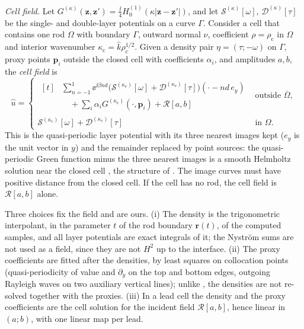 \emph{Cell field.} Let $G^{(\kappa)}(\mathbf z,\mathbf z')=\frac{\ii}{4}
H^{(1)}_0(\kappa|\mathbf z-\mathbf z'|)$, and let $\mathcal S^{(\kappa)}[\omega]$,
$\mathcal D^{(\kappa)}[\tau]$ be the single- and double-layer potentials on a
curve $\Gamma$. Consider a cell that contains one rod $\Omega$ with boundary
$\Gamma$, outward normal $\nu$, coefficient $\rho=\rho_{\mathrm c}$ in $\Omega$ and interior
wavenumber $\kappa_{\mathrm c}=\widehat k\rho_{\mathrm c}^{1/2}$. Given a density pair $\eta=(\tau;-\omega)$ on
$\Gamma$, proxy points $\mathbf p_i$ outside the closed cell with coefficients
$\alpha_i$, and amplitudes $a,b$, the \emph{cell field} is
\begin{equation}\label{eq:mfs-field}
  \widehat u=
  \begin{cases}
    \begin{aligned}[t]
      &\textstyle\sum_{n=-1}^{1}\ee^{\ii\beta nd}\bigl(\mathcal S^{(\kappa_{\mathrm e})}[\omega]
      +\mathcal D^{(\kappa_{\mathrm e})}[\tau]\bigr)(\cdot-nd\,e_y)\\
      &\quad\textstyle+\sum_i\alpha_iG^{(\kappa_{\mathrm e})}(\cdot,\mathbf p_i)+\mathcal R[a,b]
    \end{aligned}
    & \text{outside }\overline\Omega,\\[1ex]
    \mathcal S^{(\kappa_{\mathrm c})}[\omega]+\mathcal D^{(\kappa_{\mathrm c})}[\tau]
    & \text{in }\Omega .
  \end{cases}
\end{equation}
This is the quasi-periodic layer potential with its three nearest images kept
($e_y$ is the unit vector in $y$) and the remainder replaced by point sources: the quasi-periodic Green function
minus the three nearest images is a smooth Helmholtz solution near the closed
cell \cite{Linton1998}, the structure of
\cite{BarnettGreengard2010,BarnettGreengard2011,ChoBarnett2015}. The image
curves must have positive distance from the closed cell. If the cell has no rod,
the cell field is $\mathcal R[a,b]$ alone.

Three choices fix the field and are ours. (i) The density is the trigonometric
interpolant, in the parameter $t$ of the rod boundary $\boldsymbol r(t)$, of the
computed samples, and all layer potentials are exact integrals of
it; the Nystr\"om sums are not used as a field, since they are not $H^2$ up to
the interface. (ii) The proxy coefficients are fitted after the densities, by
least squares on collocation points (quasi-periodicity of value and $\partial_y$
on the top and bottom edges, outgoing Rayleigh waves on two auxiliary vertical
lines); unlike \cite{BarnettGreengard2010}, the densities are not re-solved
together with the proxies. (iii) In a lead cell the density and the proxy
coefficients are the cell solution for the incident field $\mathcal R[a,b]$,
hence linear in $(a;b)$, with one linear map per lead.


